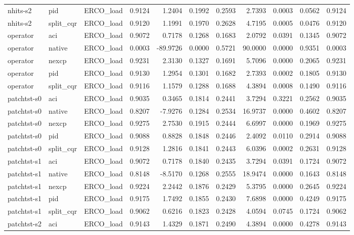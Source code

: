 \begin{tabular}{lllrrrrrrrr}
nhits-s2 & pid & ERCO_load & 0.9124 & 1.2404 & 0.1992 & 0.2593 & 2.7393 & 0.0003 & 0.0562 & 0.9124 \\
nhits-s2 & split_cqr & ERCO_load & 0.9120 & 1.1991 & 0.1970 & 0.2628 & 4.7195 & 0.0005 & 0.0476 & 0.9120 \\
operator & aci & ERCO_load & 0.9072 & 0.7178 & 0.1268 & 0.1683 & 2.0792 & 0.0391 & 0.1345 & 0.9072 \\
operator & native & ERCO_load & 0.0003 & -89.9726 & 0.0000 & 0.5721 & 90.0000 & 0.0000 & 0.9351 & 0.0003 \\
operator & nexcp & ERCO_load & 0.9231 & 2.3130 & 0.1327 & 0.1691 & 5.7096 & 0.0000 & 0.2065 & 0.9231 \\
operator & pid & ERCO_load & 0.9130 & 1.2954 & 0.1301 & 0.1682 & 2.7393 & 0.0002 & 0.1805 & 0.9130 \\
operator & split_cqr & ERCO_load & 0.9116 & 1.1579 & 0.1288 & 0.1688 & 4.3894 & 0.0008 & 0.1490 & 0.9116 \\
patchtst-s0 & aci & ERCO_load & 0.9035 & 0.3465 & 0.1814 & 0.2441 & 3.7294 & 0.3221 & 0.2562 & 0.9035 \\
patchtst-s0 & native & ERCO_load & 0.8207 & -7.9276 & 0.1284 & 0.2534 & 16.9737 & 0.0000 & 0.4602 & 0.8207 \\
patchtst-s0 & nexcp & ERCO_load & 0.9275 & 2.7530 & 0.1915 & 0.2444 & 6.6997 & 0.0000 & 0.1969 & 0.9275 \\
patchtst-s0 & pid & ERCO_load & 0.9088 & 0.8828 & 0.1848 & 0.2446 & 2.4092 & 0.0110 & 0.2914 & 0.9088 \\
patchtst-s0 & split_cqr & ERCO_load & 0.9128 & 1.2816 & 0.1841 & 0.2443 & 6.0396 & 0.0002 & 0.2631 & 0.9128 \\
patchtst-s1 & aci & ERCO_load & 0.9072 & 0.7178 & 0.1840 & 0.2435 & 3.7294 & 0.0391 & 0.1724 & 0.9072 \\
patchtst-s1 & native & ERCO_load & 0.8148 & -8.5170 & 0.1268 & 0.2555 & 18.9474 & 0.0000 & 0.1643 & 0.8148 \\
patchtst-s1 & nexcp & ERCO_load & 0.9224 & 2.2442 & 0.1876 & 0.2429 & 5.3795 & 0.0000 & 0.2645 & 0.9224 \\
patchtst-s1 & pid & ERCO_load & 0.9175 & 1.7492 & 0.1855 & 0.2430 & 7.6898 & 0.0000 & 0.4249 & 0.9175 \\
patchtst-s1 & split_cqr & ERCO_load & 0.9062 & 0.6216 & 0.1823 & 0.2428 & 4.0594 & 0.0745 & 0.1724 & 0.9062 \\
patchtst-s2 & aci & ERCO_load & 0.9143 & 1.4329 & 0.1871 & 0.2490 & 4.3894 & 0.0000 & 0.4278 & 0.9143 \\

\end{tabular}
